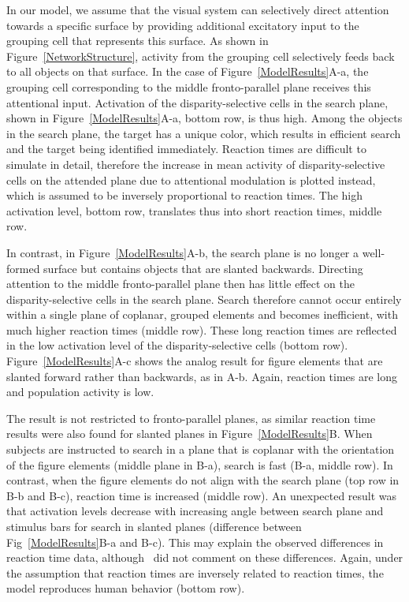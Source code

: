 In our model, we assume that the visual system can selectively direct attention towards a specific surface by providing additional excitatory input to the grouping cell that represents this surface. As shown in Figure~\ref{NetworkStructure}, activity from the grouping cell selectively feeds back to all objects on that surface. In the case of Figure~\ref{ModelResults}A-a, the grouping cell corresponding to the middle fronto-parallel plane receives this attentional input. Activation of the disparity-selective cells in the search plane, shown in Figure~\ref{ModelResults}A-a, bottom row, is thus high. Among the objects in the search plane, the target has a unique color, which results in efficient search and the target being identified immediately. Reaction times are difficult to simulate in detail, therefore the increase in mean activity of disparity-selective cells on the attended plane due to attentional modulation is plotted instead, which is assumed to be inversely proportional to reaction times. The high activation level, bottom row, translates thus into short reaction times, middle row.

In contrast, in Figure~\ref{ModelResults}A-b, the search plane is no longer a well-formed surface but contains objects that are slanted backwards. Directing attention to the middle fronto-parallel plane then has little effect on the disparity-selective cells in the search plane. Search therefore cannot occur entirely within a single plane of coplanar, grouped elements and becomes inefficient, with much higher reaction times (middle row). These long reaction times are reflected in the low activation level of the disparity-selective cells (bottom row). Figure~\ref{ModelResults}A-c shows the analog result for figure elements that are slanted forward rather than backwards, as in A-b. Again, reaction times are long and population activity is low. 

The result is not restricted to fronto-parallel planes, as similar reaction time results were also found for slanted planes in Figure~\ref{ModelResults}B. When subjects are instructed to search in a plane that is coplanar with the orientation of the figure elements (middle plane in B-a), search is fast (B-a, middle row). In contrast,
when the figure elements do not align with the search plane (top row in B-b and B-c), reaction time is increased (middle row). An unexpected result was that activation levels decrease with increasing angle between search plane and stimulus bars for search in slanted planes (difference between Fig~\ref{ModelResults}B-a and B-c). This may explain the observed differences in reaction time data, although~\citet{He_Nakayama95} did not comment on these differences. Again, under the assumption that reaction times are inversely related to reaction times, the model reproduces human behavior (bottom row).

